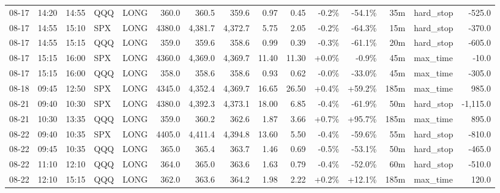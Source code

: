\documentclass[11pt,a4paper,twoside]{article}
\begin{document}
\begin{landscape}
\begin{center}
\begin{longtable}{>{\color{txtmain}}l l l l l r r r r r r r r >{\color{txtmain}}l r}
08-17 & 14:20 & 14:55 & QQQ & LONG & 360.0 & 360.5 & 359.6 & 0.97 & 0.45 & \textcolor{lossred}{-0.2\%} & \textcolor{lossred}{-54.1\%} & 35m & hard\_stop & \textcolor{lossred}{-525.0} \\
08-17 & 14:55 & 15:10 & SPX & LONG & 4380.0 & 4,381.7 & 4,372.7 & 5.75 & 2.05 & \textcolor{lossred}{-0.2\%} & \textcolor{lossred}{-64.3\%} & 15m & hard\_stop & \textcolor{lossred}{-370.0} \\
08-17 & 14:55 & 15:15 & QQQ & LONG & 359.0 & 359.6 & 358.6 & 0.99 & 0.39 & \textcolor{lossred}{-0.3\%} & \textcolor{lossred}{-61.1\%} & 20m & hard\_stop & \textcolor{lossred}{-605.0} \\
08-17 & 15:15 & 16:00 & SPX & LONG & 4360.0 & 4,369.0 & 4,369.7 & 11.40 & 11.30 & \textcolor{wingreen}{+0.0\%} & \textcolor{lossred}{-0.9\%} & 45m & max\_time & \textcolor{lossred}{-10.0} \\
08-17 & 15:15 & 16:00 & QQQ & LONG & 358.0 & 358.6 & 358.6 & 0.93 & 0.62 & \textcolor{lossred}{-0.0\%} & \textcolor{lossred}{-33.0\%} & 45m & max\_time & \textcolor{lossred}{-305.0} \\
08-18 & 09:45 & 12:50 & SPX & LONG & 4345.0 & 4,352.4 & 4,369.7 & 16.65 & 26.50 & \textcolor{wingreen}{+0.4\%} & \textcolor{wingreen}{+59.2\%} & 185m & max\_time & \textcolor{wingreen}{985.0} \\
08-21 & 09:40 & 10:30 & SPX & LONG & 4380.0 & 4,392.3 & 4,373.1 & 18.00 & 6.85 & \textcolor{lossred}{-0.4\%} & \textcolor{lossred}{-61.9\%} & 50m & hard\_stop & \textcolor{lossred}{-1,115.0} \\
08-21 & 10:30 & 13:35 & QQQ & LONG & 359.0 & 360.2 & 362.6 & 1.87 & 3.66 & \textcolor{wingreen}{+0.7\%} & \textcolor{wingreen}{+95.7\%} & 185m & max\_time & \textcolor{wingreen}{895.0} \\
08-22 & 09:40 & 10:35 & SPX & LONG & 4405.0 & 4,411.4 & 4,394.8 & 13.60 & 5.50 & \textcolor{lossred}{-0.4\%} & \textcolor{lossred}{-59.6\%} & 55m & hard\_stop & \textcolor{lossred}{-810.0} \\
08-22 & 09:45 & 10:35 & QQQ & LONG & 365.0 & 365.4 & 363.7 & 1.46 & 0.69 & \textcolor{lossred}{-0.5\%} & \textcolor{lossred}{-53.1\%} & 50m & hard\_stop & \textcolor{lossred}{-465.0} \\
08-22 & 11:10 & 12:10 & QQQ & LONG & 364.0 & 365.0 & 363.6 & 1.63 & 0.79 & \textcolor{lossred}{-0.4\%} & \textcolor{lossred}{-52.0\%} & 60m & hard\_stop & \textcolor{lossred}{-510.0} \\
08-22 & 12:10 & 15:15 & QQQ & LONG & 362.0 & 363.6 & 364.2 & 1.98 & 2.22 & \textcolor{wingreen}{+0.2\%} & \textcolor{wingreen}{+12.1\%} & 185m & max\_time & \textcolor{wingreen}{120.0} \\

\end{longtable}
\end{center}
\end{landscape}
\end{document}
